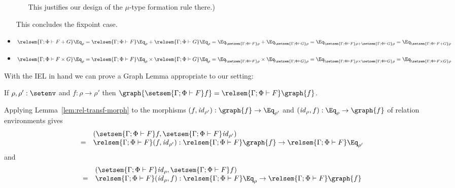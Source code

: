 \documentclass{lmcs}
\theoremstyle{plain}\newtheorem{satz}[thm]{Satz}
\renewcommand{\id}{\mathit{id}}
\begin{document}
\begin{itemize}
\begin{itemize}
This justifies our design of the $\mu$-type formation rule there.)
\end{itemize}
This concludes the fixpoint case.
\item $\relsem{\Gamma; \Phi \vdash F + G} \Eq_{\rho} =
  \relsem{\Gamma; \Phi \vdash F} \Eq_{\rho} + \relsem{\Gamma;
    \Phi \vdash G} \Eq_{\rho} = \Eq_{\setsem{\Gamma; \Phi \vdash
      F}\rho} + \Eq_{\setsem{\Gamma; \Phi \vdash G}\rho} =
  \Eq_{\setsem{\Gamma; \Phi \vdash F}\rho + \setsem{\Gamma; \Phi
      \vdash G}\rho} = \Eq_{\setsem{\Gamma; \Phi \vdash F +
      G}\rho}$
\item $\relsem{\Gamma; \Phi \vdash F \times G} \Eq_{\rho} =
  \relsem{\Gamma; \Phi \vdash F}\Eq_{\rho} \times \relsem{\Gamma;
    \Phi \vdash G}\Eq_{\rho} = \Eq_{\setsem{\Gamma; \Phi \vdash
      F}\rho} \times \Eq_{\setsem{\Gamma; \Phi \vdash G}\rho}
  = \Eq_{\setsem{\Gamma; \Phi \vdash F}\rho \times
    \setsem{\Gamma; \Phi \vdash G}\rho} = \Eq_{\setsem{\Gamma;
      \Phi \vdash F \times G}\rho}$\qedhere
\end{itemize}

\vspace*{0.1in}

With the IEL in hand we can prove a Graph Lemma appropriate to our
setting:
\begin{lem}\label{lem:graph}
If $\rho, \rho' : \setenv$ and $f : \rho \to \rho'$ then
$\graph{\setsem{\Gamma; \Phi \vdash F} f} = \relsem{\Gamma; \Phi
  \vdash F}\graph{f}$.
\end{lem}
\proof
Applying Lemma~\ref{lem:rel-transf-morph} to the morphisms $(f,
\id_{\rho'}) : \graph{f} \to \Eq_{\rho'}$ and $(\id_{\rho}, f) :
\Eq_{\rho} \to \graph{f}$ of relation environments gives 
\[\begin{array}{ll}
  & (\setsem{\Gamma; \Phi \vdash F}f, \setsem{\Gamma; \Phi \vdash
  F}\id_{\rho'})\\
= & \relsem{\Gamma; \Phi \vdash F} (f, \id_{\rho'}) :
\relsem{\Gamma; \Phi \vdash F}\graph{f} \to \relsem{\Gamma; \Phi
  \vdash F}\Eq_{\rho'}
\end{array}\] and
\[\begin{array}{ll}
  & (\setsem{\Gamma; \Phi \vdash F}\id_{\rho}, \setsem{\Gamma; \Phi
  \vdash F}f)\\
= & \relsem{\Gamma; \Phi \vdash F} (\id_{\rho}, f) : \relsem{\Gamma;
  \Phi \vdash F}\Eq_{\rho} \to \relsem{\Gamma; \Phi \vdash
  F}\graph{f}
\end{array}\] 
\end{document}
